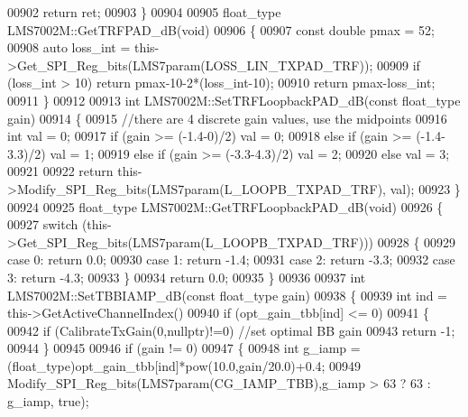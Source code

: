 \begin{DoxyCode}
{{{{{{{{{{{{{{{{{{{{{{{{{00902     \textcolor{keywordflow}{return} ret;
00903 \}
00904 
00905 float_type LMS7002M::GetTRFPAD_dB(\textcolor{keywordtype}{void})
00906 \{
00907     \textcolor{keyword}{const} \textcolor{keywordtype}{double} pmax = 52;
00908     \textcolor{keyword}{auto} loss\_int = this->Get_SPI_Reg_bits(LMS7param(LOSS_LIN_TXPAD_TRF));
00909     \textcolor{keywordflow}{if} (loss\_int > 10) \textcolor{keywordflow}{return} pmax-10-2*(loss\_int-10);
00910     \textcolor{keywordflow}{return} pmax-loss\_int;
00911 \}
00912 
00913 \textcolor{keywordtype}{int} LMS7002M::SetTRFLoopbackPAD_dB(\textcolor{keyword}{const} float_type gain)
00914 \{
00915     \textcolor{comment}{//there are 4 discrete gain values, use the midpoints}
00916     \textcolor{keywordtype}{int} val = 0;
00917     \textcolor{keywordflow}{if}      (gain >= (-1.4-0)/2)   val = 0;
00918     \textcolor{keywordflow}{else} \textcolor{keywordflow}{if} (gain >= (-1.4-3.3)/2) val = 1;
00919     \textcolor{keywordflow}{else} \textcolor{keywordflow}{if} (gain >= (-3.3-4.3)/2) val = 2;
00920     \textcolor{keywordflow}{else}                           val = 3;
00921 
00922     \textcolor{keywordflow}{return} this->Modify_SPI_Reg_bits(LMS7param(L_LOOPB_TXPAD_TRF), val);
00923 \}
00924 
00925 float_type LMS7002M::GetTRFLoopbackPAD_dB(\textcolor{keywordtype}{void})
00926 \{
00927     \textcolor{keywordflow}{switch} (this->Get_SPI_Reg_bits(LMS7param(L_LOOPB_TXPAD_TRF)))
00928     \{
00929     \textcolor{keywordflow}{case} 0: \textcolor{keywordflow}{return} 0.0;
00930     \textcolor{keywordflow}{case} 1: \textcolor{keywordflow}{return} -1.4;
00931     \textcolor{keywordflow}{case} 2: \textcolor{keywordflow}{return} -3.3;
00932     \textcolor{keywordflow}{case} 3: \textcolor{keywordflow}{return} -4.3;
00933     \}
00934     \textcolor{keywordflow}{return} 0.0;
00935 \}
00936 
00937 \textcolor{keywordtype}{int} LMS7002M::SetTBBIAMP_dB(\textcolor{keyword}{const} float_type gain)
00938 \{
00939     \textcolor{keywordtype}{int} ind = this->GetActiveChannelIndex()%
00940     \textcolor{keywordflow}{if} (opt_gain_tbb[ind] <= 0)
00941     \{
00942         \textcolor{keywordflow}{if} (CalibrateTxGain(0,\textcolor{keyword}{nullptr})!=0) \textcolor{comment}{//set optimal BB gain}
00943             \textcolor{keywordflow}{return} -1;
00944     \}
00945 
00946     \textcolor{keywordflow}{if} (gain != 0)
00947     \{
00948           \textcolor{keywordtype}{int} g\_iamp = (float_type)opt_gain_tbb[ind]*pow(10.0,gain/20.0)+0.4;
00949           Modify_SPI_Reg_bits(LMS7param(CG_IAMP_TBB),g\_iamp > 63 ? 63 : g\_iamp, \textcolor{keyword}{true});
}}}}}}}}}}}}}}}}}}}}}}}}}
\end{DoxyCode}
